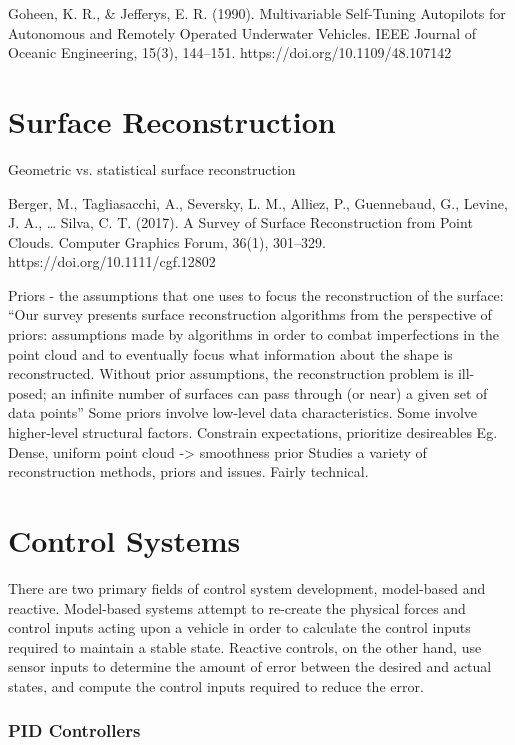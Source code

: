 \documentclass[10pt]{article}
\begin{document}
\cite{Goheen1990}
Goheen, K. R., \& Jefferys, E. R. (1990). Multivariable Self-Tuning Autopilots for Autonomous and Remotely Operated Underwater Vehicles. IEEE Journal of Oceanic Engineering, 15(3), 144–151. https://doi.org/10.1109/48.107142

\section{Surface Reconstruction}

Geometric vs. statistical surface reconstruction

Berger, M., Tagliasacchi, A., Seversky, L. M., Alliez, P., Guennebaud, G., Levine, J. A., … Silva, C. T. (2017). A Survey of Surface Reconstruction from Point Clouds. Computer Graphics Forum, 36(1), 301–329. https://doi.org/10.1111/cgf.12802

Priors - the assumptions that one uses to focus the reconstruction of the surface:
“Our survey presents surface reconstruction algorithms from the perspective of priors: assumptions made by algorithms in order to combat imperfections in the point cloud and to eventually focus what information about the shape is reconstructed. Without prior assumptions, the reconstruction problem is ill-posed; an infinite number of surfaces can pass through (or near) a given set of data points”
Some priors involve low-level data characteristics. Some involve higher-level structural factors.
Constrain expectations, prioritize desireables
Eg. Dense, uniform point cloud -> smoothness prior
Studies a variety of reconstruction methods, priors and issues. 
Fairly technical.

\section{Control Systems}

There are two primary fields of control system development, model-based and reactive. Model-based systems attempt to re-create the physical forces and control inputs acting upon a vehicle in order to calculate the control inputs required to maintain a stable state. Reactive controls, on the other hand, use sensor inputs to determine the amount of error between the desired and actual states, and compute the control inputs required to reduce the error.

\subsubsection{PID Controllers}
\end{document}
